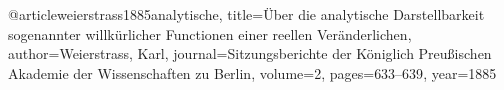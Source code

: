 @article{weierstrass1885analytische,
  title={{\"U}ber die analytische Darstellbarkeit sogenannter willk{\"u}rlicher Functionen einer reellen Ver{\"a}nderlichen},
  author={Weierstrass, Karl},
  journal={Sitzungsberichte der K{\"o}niglich Preu{\ss}ischen Akademie der Wissenschaften zu Berlin},
  volume={2},
  pages={633--639},
  year={1885}
}